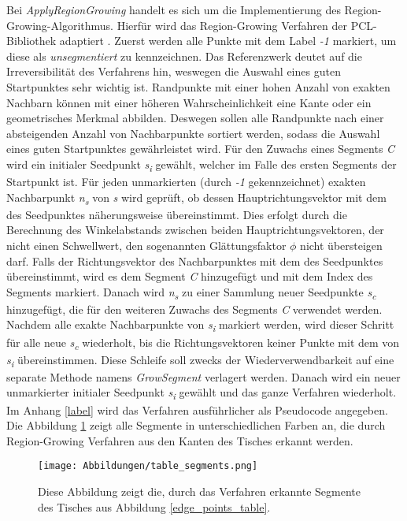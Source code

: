 Bei \textit{ApplyRegionGrowing} handelt es sich um die Implementierung des Region-Growing-Algorithmus. Hierfür wird das Region-Growing Verfahren der PCL-Bibliothek adaptiert \autocite{rusu_3d_2011}. Zuerst werden alle Punkte mit dem Label \textit{-1} markiert, um diese als \textit{unsegmentiert} zu kennzeichnen. Das Referenzwerk deutet auf die Irreversibilität des Verfahrens hin, weswegen die Auswahl eines guten Startpunktes sehr wichtig ist. Randpunkte mit einer hohen Anzahl von exakten Nachbarn können mit einer höheren Wahrscheinlichkeit eine Kante oder ein geometrisches Merkmal abbilden. Deswegen sollen alle Randpunkte nach einer absteigenden Anzahl von Nachbarpunkte sortiert werden, sodass die Auswahl eines guten Startpunktes gewährleistet wird. Für den Zuwachs eines Segments \textit{C} wird ein initialer Seedpunkt \textit{s\textsubscript{i}} gewählt, welcher im Falle des ersten Segments der Startpunkt ist. Für jeden unmarkierten (durch \textit{-1} gekennzeichnet) exakten Nachbarpunkt \textit{n\textsubscript{s}} von \textit{s} wird geprüft, ob dessen Hauptrichtungsvektor mit dem des Seedpunktes näherungsweise übereinstimmt. Dies erfolgt durch die Berechnung des Winkelabstands zwischen beiden Hauptrichtungsvektoren, der nicht einen Schwellwert, den sogenannten Glättungsfaktor $\phi$ nicht übersteigen darf. Falls der Richtungsvektor des Nachbarpunktes mit dem des Seedpunktes übereinstimmt, wird es dem Segment \textit{C} hinzugefügt und mit dem Index des Segments markiert. Danach wird \textit{n\textsubscript{s}} zu einer Sammlung neuer Seedpunkte \textit{s\textsubscript{c}} hinzugefügt, die für den weiteren Zuwachs des Segments \textit{C} verwendet werden. Nachdem alle exakte Nachbarpunkte von \textit{s\textsubscript{i}} markiert werden, wird dieser Schritt für alle neue \textit{s\textsubscript{c}} wiederholt, bis die Richtungsvektoren keiner Punkte mit dem von \textit{s\textsubscript{i}} übereinstimmen. Diese Schleife soll zwecks der Wiederverwendbarkeit auf eine separate Methode namens \textit{GrowSegment} verlagert werden. Danach wird ein neuer unmarkierter initialer Seedpunkt \textit{s\textsubscript{i}} gewählt und das ganze Verfahren wiederholt. Im Anhang \ref{label} wird das Verfahren ausführlicher als Pseudocode angegeben. Die Abbildung \ref{segments_table} zeigt alle Segmente in unterschiedlichen Farben an, die durch Region-Growing Verfahren aus den Kanten des Tisches erkannt werden.

\begin{figure}[h]
	\texttt{[image: Abbildungen/table\_segments.png]}
	\centering
	\caption{Diese Abbildung zeigt die, durch das Verfahren erkannte  Segmente des Tisches aus Abbildung \ref{edge_points_table}.}
	\label{segments_table}
\end{figure}

